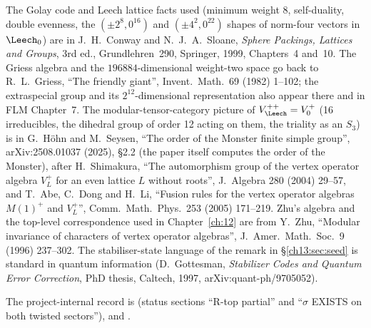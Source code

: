 The Golay code and Leech lattice facts used (minimum weight $8$, self-duality, double evenness,
the $(\pm2^8,0^{16})$ and $(\pm4^2,0^{22})$ shapes of norm-four vectors in $\Leech_0$) are in J.~H.~Conway and
N.~J.~A.~Sloane, \emph{Sphere Packings, Lattices and Groups}, 3rd ed., Grundlehren~290, Springer, 1999,
Chapters~4 and~10. The Griess algebra and the $196884$-dimensional weight-two space go back to R.~L.~Griess,
``The friendly giant'', Invent.\ Math.\ 69 (1982) 1--102; the extraspecial group and its
$2^{12}$-dimensional representation also appear there and in FLM Chapter~7. The modular-tensor-category
picture of $V_\Leech^{++}=\chthirteenV$ (16 irreducibles, the dihedral group of order 12 acting on them, the
triality as an $S_3$) is in G.~H\"ohn and M.~Seysen, ``The order of the Monster finite simple group'',
arXiv:2508.01037 (2025), \S2.2 (the paper itself computes the order of the Monster), after H.~Shimakura, ``The automorphism group of the
vertex operator algebra $V_L^+$ for an even lattice $L$ without roots'', J.~Algebra 280 (2004) 29--57, and
T.~Abe, C.~Dong and H.~Li, ``Fusion rules for the vertex operator algebras $M(1)^+$ and $V_L^+$'', Comm.\
Math.\ Phys.\ 253 (2005) 171--219. Zhu's algebra and the top-level correspondence used in
Chapter~\ref{ch:12} are from Y.~Zhu, ``Modular invariance of characters of vertex operator algebras'',
J.\ Amer.\ Math.\ Soc.\ 9 (1996) 237--302. The stabiliser-state language of the remark in
\S\ref{ch13:sec:seed} is standard in quantum information (D.~Gottesman, \emph{Stabilizer Codes and Quantum
Error Correction}, PhD thesis, Caltech, 1997, arXiv:quant-ph/9705052).

The project-internal record is  (status sections ``R-top partial'' and
``$\sigma$ EXISTS on both twisted sectors''), \leanpath{Notes/TrialityTwisted.md} and .
